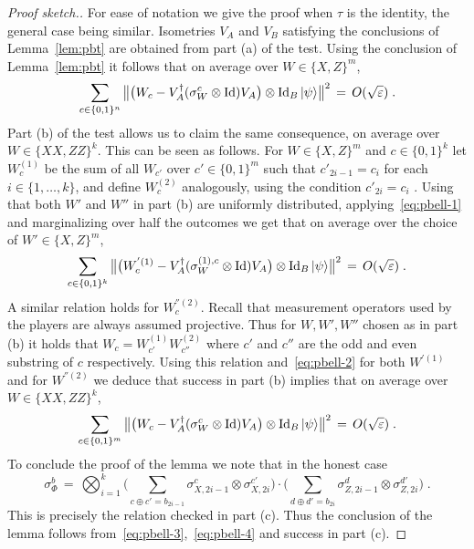 \begin{proof}[Proof sketch.]
For ease of notation we give the proof when $\tau$ is the identity, the general case being similar. 
Isometries $V_A$ and $V_B$ satisfying the conclusions of 
Lemma~\ref{lem:pbt} are obtained from part (a) of the test. Using the conclusion of Lemma~\ref{lem:pbt} it follows that on average over $W\in\{X,Z\}^m$, 
\begin{equation}\label{eq:pbell-1}
 \sum_{c\in\{0,1\}^n} \big\| \big(W_c -V_A^\dagger (\sigma_W^c \otimes \mathop{\rm Id}\nolimits) V_A\big) \otimes \mathop{\rm Id}\nolimits_B |\psi\rangle \big\|^2 \,=\, O(\sqrt{\varepsilon})\;.
\end{equation}
Part (b) of the test allows us to claim the same consequence, on average over $W\in\{XX,ZZ\}^k$. This can be seen as follows. For $W\in\{X,Z\}^m$ and $c\in\{0,1\}^k$ let $W^{(1)}_c$ be the sum of all $W_{c'}$ over $c'\in\{0,1\}^m$ such that $c'_{2i-1}=c_i$ for each $i\in \{1,\ldots,k\}$, and define $W^{(2)}_c$ analogously, using the condition $c'_{2i}=c_i$ . Using that both $W'$ and $W''$ in part (b) are uniformly distributed, applying~\eqref{eq:pbell-1} and marginalizing over half the outcomes we get that on average over the choice of $W'\in\{X,Z\}^m $,
\begin{equation}\label{eq:pbell-2}
 \sum_{c\in\{0,1\}^k} \big\| \big(W^{'(1)}_c -V_A^\dagger (\sigma_W^{(1),c} \otimes \mathop{\rm Id}\nolimits) V_A\big) \otimes \mathop{\rm Id}\nolimits_B |\psi\rangle \big\|^2 \,=\, O(\sqrt{\varepsilon})\;.
\end{equation}
A similar relation holds for $W^{''(2)}_c$. Recall that measurement operators used by the players are always assumed projective. Thus for $W,W',W''$ chosen as in part (b) it holds that $W_c = W^{(1)}_{c'} W^{(2)}_{c''}$ where $c'$ and $c''$ are the odd and even substring of $c$ respectively. Using this relation and~\eqref{eq:pbell-2} for both $W^{'(1)}$ and for $W^{''(2)}$ we deduce that success in part (b) implies that on average over $W\in\{XX,ZZ\}^k$,
\begin{equation}\label{eq:pbell-3}
 \sum_{c\in\{0,1\}^m} \big\| \big(W_c -V_A^\dagger (\sigma_W^{c }\otimes \mathop{\rm Id}\nolimits) V_A\big) \otimes \mathop{\rm Id}\nolimits_B |\psi\rangle \big\|^2 \,=\, O(\sqrt{\varepsilon})\;.
\end{equation}
To conclude the proof of the lemma we note that in the honest case
\begin{equation}\label{eq:pbell-4}
 \sigma_{\Phi}^b \,=\, \bigotimes_{i=1}^k \Big( \sum_{c\oplus c' = b_{2i-1}} \sigma_{X,2i-1}^{c}\otimes \sigma_{X,2i}^{c'}\Big)\cdot\Big(\sum_{d\oplus d' = b_{2i} }\sigma_{Z,2i-1}^{d}\otimes \sigma_{Z,2i}^{d'}\Big)\;.
\end{equation}
This is precisely the relation checked in part (c). Thus the conclusion of the lemma follows from~\eqref{eq:pbell-3},~\eqref{eq:pbell-4} and success in part (c).  
\end{proof}



